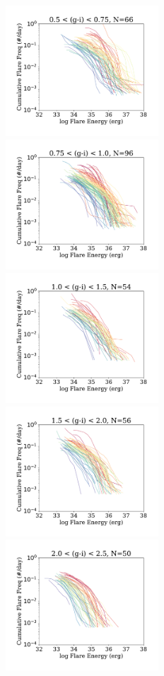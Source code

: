 \documentclass[preprint2]{aastex62}
\begin{document}
\begin{figure}[!ht]
\centering
\includegraphics[width=2.25in]{fig7a}
\includegraphics[width=2.25in]{fig7b}
\includegraphics[width=2.25in]{fig7c}\\
\includegraphics[width=2.25in]{fig7d}
\includegraphics[width=2.25in]{fig7e}

\end{figure}
\end{document}

